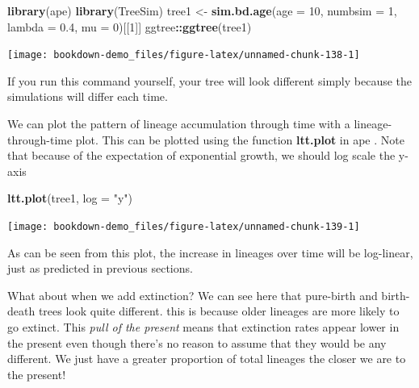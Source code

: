 \documentclass[
]{book}
\newenvironment{Shaded}{\begin{snugshade}}{\end{snugshade}}
\newcommand{\DataTypeTok}[1]{\textcolor[rgb]{0.13,0.29,0.53}{#1}}
\newcommand{\DecValTok}[1]{\textcolor[rgb]{0.00,0.00,0.81}{#1}}
\newcommand{\FloatTok}[1]{\textcolor[rgb]{0.00,0.00,0.81}{#1}}
\newcommand{\KeywordTok}[1]{\textcolor[rgb]{0.13,0.29,0.53}{\textbf{#1}}}
\newcommand{\NormalTok}[1]{#1}
\newcommand{\OperatorTok}[1]{\textcolor[rgb]{0.81,0.36,0.00}{\textbf{#1}}}
\newcommand{\StringTok}[1]{\textcolor[rgb]{0.31,0.60,0.02}{#1}}
\begin{document}
\begin{Shaded}
\begin{Highlighting}[]
\KeywordTok{library}\NormalTok{(ape)}
\KeywordTok{library}\NormalTok{(TreeSim)}
\NormalTok{tree1 \textless{}{-}}\StringTok{ }\KeywordTok{sim.bd.age}\NormalTok{(}\DataTypeTok{age =} \DecValTok{10}\NormalTok{, }\DataTypeTok{numbsim =} \DecValTok{1}\NormalTok{, }\DataTypeTok{lambda =} \FloatTok{0.4}\NormalTok{, }\DataTypeTok{mu =} \DecValTok{0}\NormalTok{)[[}\DecValTok{1}\NormalTok{]]}
\NormalTok{ggtree}\OperatorTok{::}\KeywordTok{ggtree}\NormalTok{(tree1)}
\end{Highlighting}
\end{Shaded}

\begin{center}\texttt{[image: bookdown-demo\_files/figure-latex/unnamed-chunk-138-1]} \end{center}

If you run this command yourself, your tree will look different simply because the simulations will differ each time.

We can plot the pattern of lineage accumulation through time with a lineage-through-time plot. This can be plotted using the function \textbf{ltt.plot} in ape \citep{ape}. Note that because of the expectation of exponential growth, we should log scale the y-axis

\begin{Shaded}
\begin{Highlighting}[]
\KeywordTok{ltt.plot}\NormalTok{(tree1, }\DataTypeTok{log =} \StringTok{"y"}\NormalTok{)}
\end{Highlighting}
\end{Shaded}

\begin{center}\texttt{[image: bookdown-demo\_files/figure-latex/unnamed-chunk-139-1]} \end{center}

As can be seen from this plot, the increase in lineages over time will be log-linear, just as predicted in previous sections.

What about when we add extinction? We can see here that pure-birth and birth-death trees look quite different. this is because older lineages are more likely to go extinct. This \emph{pull of the present} means that extinction rates appear lower in the present even though there's no reason to assume that they would be any different. We just have a greater proportion of total lineages the closer we are to the present!
\end{document}
